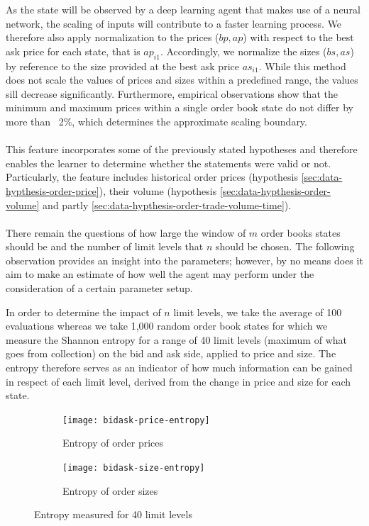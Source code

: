 As the state will be observed by a deep learning agent that makes use of a neural network, the scaling of inputs will contribute to a faster learning process.
We therefore also apply normalization to the prices ($bp, ap$) with respect to the best ask price for each state, that is $ap_{i1}$.
Accordingly, we normalize the sizes ($bs, as$) by reference to the size provided at the best ask price $as_{i1}$.
While this method does not scale the values of prices and sizes within a predefined range, the values sill decrease significantly.
Furthermore, empirical observations show that the minimum and maximum prices within a single order book state do not differ by more than ~2\%, which determines the approximate scaling boundary.
\\
\\
This feature incorporates some of the previously stated hypotheses and therefore enables the learner to determine whether the statements were valid or not.
Particularly, the feature includes historical order prices (hypothesis \ref{sec:data-hypthesis-order-price}), their volume (hypothesis \ref{sec:data-hypthesis-order-volume} and partly \ref{sec:data-hypthesis-order-trade-volume-time}).
\\
\\
There remain the questions of how large the window of $m$ order books states should be and the number of limit levels that $n$ should be chosen.
The following observation provides an insight into the parameters; however, by no means does it aim to make an estimate of how well the agent may perform under the consideration of a certain parameter setup.

In order to determine the impact of $n$ limit levels, we take the average of 100 evaluations whereas we take 1,000 random order book states for which we measure the Shannon entropy\cite{shannon2001mathematical} for a range of 40 limit levels (maximum of what goes from collection) on the bid and ask side, applied to price and size.
The entropy therefore serves as an indicator of how much information can be gained in respect of each limit level, derived from the change in price and size for each state.

\begin{figure}[H]
    \centering
    \begin{subfigure}[b]{0.45\textwidth}
        \texttt{[image: bidask-price-entropy]}
        \caption{Entropy of order prices}
        \label{fig:bidask-price-entropy}
    \end{subfigure}
    \begin{subfigure}[b]{0.45\textwidth}
        \texttt{[image: bidask-size-entropy]}
        \caption{Entropy of order sizes}
        \label{fig:bidask-size-entropy}
    \end{subfigure}
    \caption{Entropy measured for 40 limit levels}\label{fig:bidask-entropy}
\end{figure}

